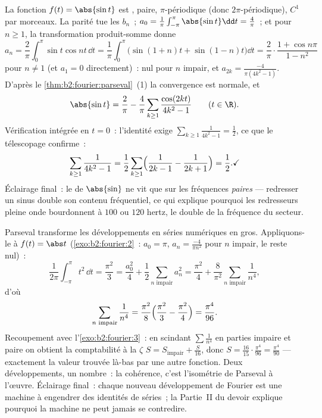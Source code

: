 \begin{example}\label{ex:b2:fourier:abssin}
La fonction $f(t) = \abs{\sin t}$ est , paire,
$\pi$-périodique (donc $2\pi$-périodique), $C^1$ par morceaux. La
parité tue les $b_n$~; $a_0 = \frac1\pi\int_{-\pi}^{\pi} \abs{\sin
t}\dd t = \frac4\pi$~; et pour $n \geq 1$, la transformation
produit-somme donne
\[
a_n = \frac2\pi\int_0^\pi \sin t\cos nt\,\dd t
= \frac{1}{\pi}\int_0^\pi\bigl(\sin(1+n)t +
\sin(1-n)t\bigr)\dd t
= \frac2\pi\cdot\frac{1 + \cos n\pi}{1 - n^2}
\]
pour $n \neq 1$ (et $a_1 = 0$ directement)~: nul pour $n$ impair, et
$a_{2k} = \frac{-4}{\pi(4k^2-1)}$. D'après le
\cref{thm:b2:fourier:parseval}~(1) la convergence est normale, et
\[
\abs{\sin t} = \frac{2}{\pi} - \frac{4}{\pi}
\sum_{k\geq1}\frac{\cos(2kt)}{4k^2 - 1}
\qquad (t \in \R) .
\]
Vérification intégrée en $t = 0$~: l'identité exige
$\sum_{k\geq1}\frac{1}{4k^2-1} = \frac12$, ce que le télescopage
confirme~:
\[
\sum_{k\geq1}\frac{1}{4k^2-1}
= \frac12\sum_{k\geq1}\Bigl(\frac{1}{2k-1} -
\frac{1}{2k+1}\Bigr) = \frac12 . \checkmark
\]
Éclairage final~: le  de $\abs{\sin}$ ne vit que sur les
fréquences \emph{paires} --- redresser un sinus double son contenu
fréquentiel, ce qui explique pourquoi les redresseurs pleine onde
bourdonnent à $100$ ou $120$ hertz, le double de la fréquence du
secteur.
\end{example}

\begin{example}\label{ex:b2:fourier:zetafourodd}
Parseval transforme les développements en séries numériques en
gros. Appliquons-le à $f(t) = \abs t$ (\cref{exo:b2:fourier:2}~: $a_0
= \pi$, $a_n = \frac{-4}{\pi n^2}$ pour $n$ impair, le reste nul)~:
\[
\frac{1}{2\pi}\int_{-\pi}^{\pi}t^2\,\dd t = \frac{\pi^2}{3}
= \frac{a_0^2}{4} + \frac12\sum_{n \text{ impair}} a_n^2
= \frac{\pi^2}{4} +
\frac{8}{\pi^2}\sum_{n\text{ impair}}\frac{1}{n^4} ,
\]
d'où
\[
\sum_{n\text{ impair}}\frac{1}{n^4}
= \frac{\pi^2}{8}\Bigl(\frac{\pi^2}{3} -
\frac{\pi^2}{4}\Bigr) = \frac{\pi^4}{96} .
\]
Recoupement avec l'\cref{exo:b2:fourier:3}~: en scindant
$\sum\frac1{n^4}$ en parties impaire et paire on obtient la
comptabilité à la $\zeta$ $S = S_{\mathrm{impair}} + \frac{S}{16}$,
donc $S = \frac{16}{15}\cdot\frac{\pi^4}{96} = \frac{\pi^4}{90}$ ---
exactement la valeur trouvée là-bas par une autre fonction. Deux
développements, un nombre~: la cohérence, c'est l'isométrie de
Parseval à l'œuvre. Éclairage final~: chaque nouveau développement
de Fourier est une machine à engendrer des identités de séries~; la
Partie~II du devoir explique pourquoi la machine ne peut jamais se
contredire.
\end{example}

